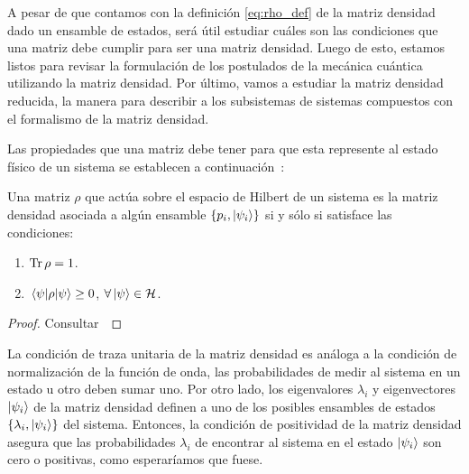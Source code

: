 A pesar de que contamos con la definición \eqref{eq:rho_def} de 
la matriz densidad dado un ensamble de estados, será útil 
estudiar cuáles son las condiciones que una matriz debe cumplir 
para ser una matriz densidad. Luego de esto, estamos listos 
para revisar la formulación de los postulados de la mecánica cuántica
utilizando la matriz densidad. Por último, vamos a estudiar la
matriz densidad reducida, la manera para describir a los
subsistemas de sistemas compuestos con el formalismo 
de la matriz densidad.

Las propiedades que una matriz debe tener para que esta represente al 
estado físico de un sistema se establecen a 
continuación~\cite{nielsen_chuang_2011}:
\begin{thm}\label{teo:density-matrix}
Una matriz $\rho$  que actúa sobre el espacio de Hilbert de un sistema 
es la matriz densidad asociada a algún ensamble 
$\{p_i, \ket{\psi _i} \}$ si y sólo si satisface las condiciones:
\begin{enumerate}
\item $\Tr \rho = 1$.
\item $\matrixel{\psi}{\rho}{\psi} \geq 0$, $\forall\ket{\psi} \in \mathcal{H}$.
\end{enumerate}	
\end{thm} 
\begin{proof} Consultar~\cite[p.~101]{nielsen_chuang_2011} \end{proof}

La condición de traza unitaria de la matriz densidad es análoga
a la condición de normalización de la función de onda, las probabilidades
de medir al sistema en un estado u otro deben sumar uno. 
Por otro lado, los eigenvalores $\lambda_i$ y eigenvectores $\ket{\psi_i}$ de la 
matriz densidad definen a uno de los posibles ensambles de estados
$\{\lambda_i, \ket{\psi_i} \}$ del sistema. Entonces,
la condición de positividad de la matriz densidad asegura que las
probabilidades $\lambda_i$ de encontrar al sistema en el estado $\ket{\psi_i}$
son cero o positivas, como esperaríamos que fuese. 

